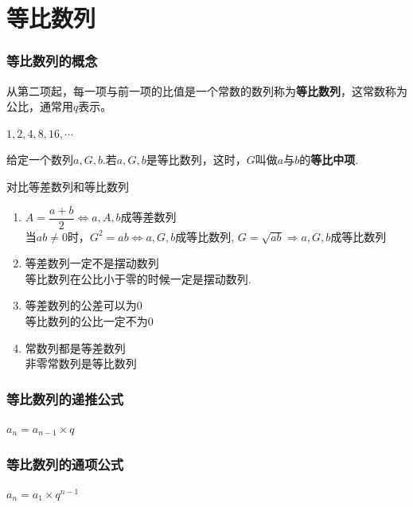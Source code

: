 \section*{等比数列}
\subsubsection*{等比数列的概念}
从第二项起，每一项与前一项的比值是一个常数的数列称为\textbf{等比数列}，这常数称为公比，通常用$q$表示。
\begin{example}
    $1,2,4,8, 16,\cdots$
\end{example}
给定一个数列$a, G, b$.若$a, G, b$是等比数列，这时，$G$叫做$a$与$b$的\textbf{等比中项}.

对比等差数列和等比数列
\begin{enumerate}
    \item $A = \dfrac{a+b}{2} \Longleftrightarrow a, A, b$成等差数列 \\
    当$ab \neq 0$时，$G^2 = ab \Longleftrightarrow a, G, b$成等比数列, $G = \sqrt{ab} \Longrightarrow a, G, b$成等比数列
    \item 等差数列一定不是摆动数列 \\
    等比数列在公比小于零的时候一定是摆动数列.
    \item 等差数列的公差可以为0 \\
    等比数列的公比一定不为0
    \item 常数列都是等差数列 \\
    非零常数列是等比数列
\end{enumerate}


\subsubsection*{等比数列的递推公式}
$a_n = a_{n-1} \times q$
\subsubsection*{等比数列的通项公式}
$a_n = a_1 \times q^{n-1}$

